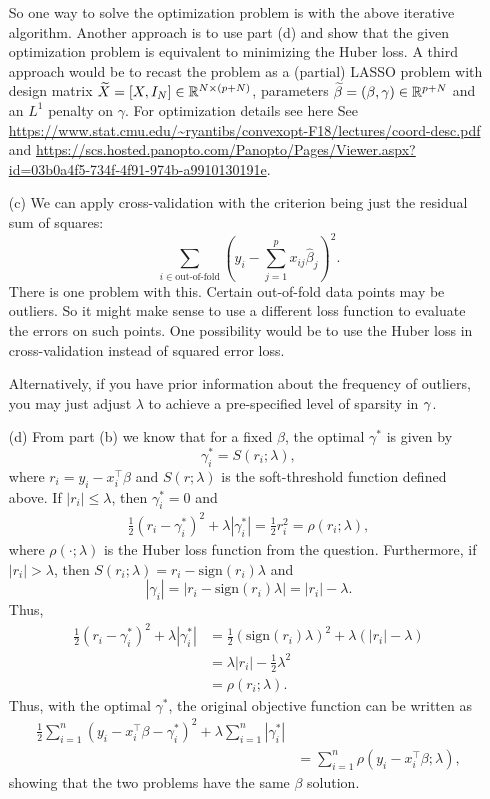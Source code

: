 \begin{itemize}
\begin{enumerate}
\begin{enumerate}
	\end{enumerate}
\end{enumerate}
So one way to solve the optimization problem is with the above iterative algorithm. Another approach is to use part (d) and show that the given optimization problem is equivalent to minimizing the Huber loss. A third approach would be to recast the problem as a (partial) LASSO problem with design matrix $\widetilde{X} = [X,I_N] \in \mathbb{R}^{N \times (p+N)}$, parameters $\widetilde{\beta}=(\beta,{\gamma}) \in \mathbb{R}^{p + N}$ and an $L^1$ penalty on $\gamma$. For optimization details see here  See \url{https://www.stat.cmu.edu/~ryantibs/convexopt-F18/lectures/coord-desc.pdf} and \url{https://scs.hosted.panopto.com/Panopto/Pages/Viewer.aspx?id=03b0a4f5-734f-4f91-974b-a9910130191e}.
\item[(c)] We can apply cross-validation with the criterion being just the residual sum of squares:
\begin{equation*}
\sum_{i \in \text{out-of-fold}} \left( y_i - \sum_{j=1}^p x_{ij}\hat{\beta}_j \right)^2.
\end{equation*}
There is one problem with this. Certain out-of-fold data points may be outliers. So it might make sense to use a different loss function to evaluate the errors on such points. One possibility would be to use the Huber loss in cross-validation instead of squared error loss.

Alternatively, if you have prior information about the frequency of outliers, you may just adjust $\lambda$ to achieve a pre-specified level of sparsity in ${\bf \gamma}$.
	
\item[(d)] 	From part (b) we know that for a fixed $\beta$, the optimal $\gamma^*$ is given by
\[\gamma^*_i = S(r_i;\lambda), \]
where $r_i = y_i - x_i^\top \beta$ and $S(r;\lambda)$ is the soft-threshold function defined above. If $|r_i| \le \lambda$, then $\gamma_i^* = 0$ and 
\begin{align*}
	\frac{1}{2}(r_i-\gamma_i^*)^2 + \lambda |\gamma_i^*| = \frac{1}{2}r_i^2 = \rho(r_i;\lambda),
\end{align*}
where $\rho(\cdot;\lambda)$ is the Huber loss function from the question. Furthermore, if $|r_i| >\lambda$, then $S(r_i;\lambda) = r_i - \mathrm{sign}(r_i)\lambda$ and 
\[|\gamma_i| = |r_i - \mathrm{sign}(r_i)\lambda| = |r_i|-\lambda. \]
Thus,
\begin{align*}
	\frac{1}{2}(r_i-\gamma_i^*)^2 + \lambda |\gamma_i^*| &= \frac{1}{2}(\mathrm{sign}(r_i)\lambda)^2 +\lambda(|r_i|-\lambda) \\
	&=\lambda|r_i|-\frac{1}{2}\lambda^2\\
	&=\rho(r_i;\lambda).
\end{align*}
Thus, with the optimal $\gamma^*$, the original objective function can be written as
\begin{align*}
	\frac{1}{2}\sum_{i=1}^n (y_i-x_i^\top \beta-\gamma_i^*)^2 + \lambda\sum_{i=1}^n |\gamma_i^*|\\
	&=\sum_{i=1}^n \rho(y_i-x_i^\top \beta;\lambda),
\end{align*}
showing that the two problems have the same $\beta$ solution.
	

\end{itemize}
